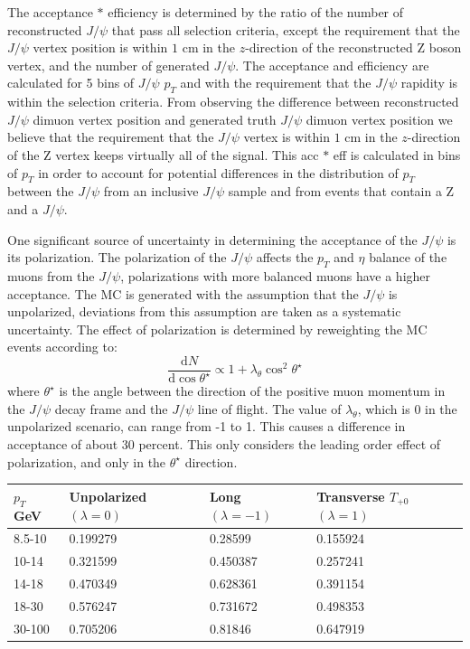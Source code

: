 \documentclass[a4paper,12pt]{article}
\begin{document}
The acceptance $\ast$ efficiency is determined by the ratio of the number of reconstructed $J\slash \psi$ that pass all selection criteria, except the requirement that the $J\slash \psi$ vertex position is within $1$ \unit{cm} in the $z$-direction of the reconstructed Z boson vertex, and the number of generated $J\slash \psi$. The acceptance and efficiency are calculated for 5 bins of $J\slash \psi$ $p_T$ and with the requirement that the $J\slash \psi$ rapidity is within the selection criteria. From observing the difference between reconstructed $J\slash \psi$ dimuon vertex position and generated truth $J\slash \psi$ dimuon vertex position we believe that the requirement that the $J\slash \psi$ vertex is within $1$ \unit{cm} in the $z$-direction of the Z vertex keeps virtually all of the signal. This acc $\ast$ eff is calculated in bins of $p_T$ in order to account for potential differences in the distribution of $p_T$ between the $J\slash \psi$ from an inclusive $J\slash \psi$ sample and from events that contain a Z and a $J\slash \psi$.

One significant source of uncertainty in determining the acceptance of the $J\slash \psi$ is its polarization. The polarization of the $J\slash \psi$ affects the $p_T$ and $\eta$ balance of the muons from the $J\slash \psi$, polarizations with more balanced muons have a higher acceptance. The MC is generated with the assumption that the $J\slash \psi$ is unpolarized, deviations from this assumption are taken as a systematic uncertainty. The effect of polarization is determined by reweighting the MC events according to:
\begin{equation} \label{eq2}
  \frac{\mathrm d N}{\mathrm d \cos{\theta^{\star}}} \propto 1 + \lambda_{\theta} \cos^2{\theta^{\star}}
\end{equation}
where $\theta^{\star}$ is the angle between the direction of the positive muon momentum in the $J\slash \psi$ decay frame and the $J\slash \psi$ line of flight. The value of $\lambda_{\theta}$, which is $0$ in the unpolarized scenario, can range from -1 to 1. This causes a difference in acceptance of about 30 percent. This only considers the leading order effect of polarization, and only in the $\theta^{\star}$ direction.

\begin{center}
  \begin{tabular}{ | l | l | l | l | }
    \hline
    $p_T$ \unit{GeV} & Unpolarized $(\lambda = 0)$ & Long $(\lambda = -1)$ & Transverse $T_{+0}$ $(\lambda = 1)$ \\ \hline
    8.5-10 & 0.199279 & 0.28599   & 0.155924  \\ \hline
    10-14  & 0.321599 & 0.450387  & 0.257241  \\ \hline
    14-18  & 0.470349 & 0.628361  & 0.391154  \\ \hline
    18-30  & 0.576247 & 0.731672  & 0.498353  \\ \hline
    30-100 & 0.705206 & 0.81846   & 0.647919  \\ \hline
    \hline
  \end{tabular}
\end{center}
\end{document}
